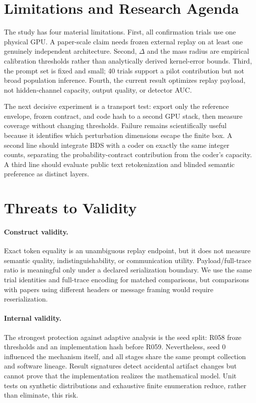 \documentclass[sigconf,review,nonacm]{acmart}
\begin{document}
\section{Limitations and Research Agenda}
The study has four material limitations. First, all confirmation trials use one physical GPU. A paper-scale claim needs frozen external replay on at least one genuinely independent architecture. Second, $\Delta$ and the mass radius are empirical calibration thresholds rather than analytically derived kernel-error bounds. Third, the prompt set is fixed and small; 40 trials support a pilot contribution but not broad population inference. Fourth, the current result optimizes replay payload, not hidden-channel capacity, output quality, or detector AUC.

The next decisive experiment is a transport test: export only the reference envelope, frozen contract, and code hash to a second GPU stack, then measure coverage without changing thresholds. Failure remains scientifically useful because it identifies which perturbation dimensions escape the finite box. A second line should integrate BDS with a coder on exactly the same integer counts, separating the probability-contract contribution from the coder's capacity. A third line should evaluate public text retokenization and blinded semantic preference as distinct layers.

\section{Threats to Validity}
\paragraph{Construct validity.}
Exact token equality is an unambiguous replay endpoint, but it does not measure semantic quality, indistinguishability, or communication utility. Payload/full-trace ratio is meaningful only under a declared serialization boundary. We use the same trial identities and full-trace encoding for matched comparisons, but comparisons with papers using different headers or message framing would require reserialization.

\paragraph{Internal validity.}
The strongest protection against adaptive analysis is the seed split: R058 froze thresholds and an implementation hash before R059. Nevertheless, seed 0 influenced the mechanism itself, and all stages share the same prompt collection and software lineage. Result signatures detect accidental artifact changes but cannot prove that the implementation realizes the mathematical model. Unit tests on synthetic distributions and exhaustive finite enumeration reduce, rather than eliminate, this risk.
\end{document}
